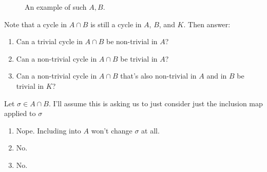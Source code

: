 \begin{figure}[h]
  \caption{An example of such $A,B$.}
\end{figure}

\begin{problem}[16.32]
  Note that a cycle in $A \cap B$ is still a cycle in $A$, $B$, and
  $K$. Then answer:
  \begin{enumerate}
  \item Can a trivial cycle in $A \cap B$ be non-trivial in $A$?
  \item Can a non-trivial cycle in $A \cap B$ be trivial in $A$?
  \item Can a non-trivial cycle in $A \cap B$ that's also
    non-trivial in $A$ and in $B$ be trivial in $K$?
  \end{enumerate}
\end{problem}
\begin{solution}
  Let $\sigma \in A \cap B$. I'll assume this is asking us to just
  consider just the inclusion map applied to $\sigma$
  \begin{enumerate}
  \item Nope. Including into $A$ won't change $\sigma$ at all.
  \item No.
  \item No.
  \end{enumerate}
\end{solution}

